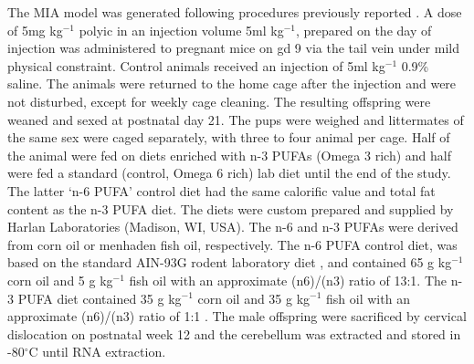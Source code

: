 The MIA model was generated following procedures previously reported \citep{Li2009c}. 
A dose of 5mg kg$^{-1}$ \gls{polyic} in an injection volume 5ml kg$^{-1}$, prepared on the day of injection was administered to pregnant mice on \gls{gd} 9 via the tail vein under mild physical constraint. 
Control animals received an injection of 5ml kg$^{-1}$ 0.9\% saline. 
The animals were returned to the home cage after the injection and were not disturbed, except for weekly cage cleaning.
The resulting offspring were weaned and sexed at postnatal day 21. 
The pups were weighed and littermates of the same sex were caged separately, with three to four animal per cage.
Half of the animal were fed on diets enriched with n-3 PUFAs (Omega 3 rich) and half were fed a standard (control, Omega 6 rich) lab diet until the end of the study.
The latter `n-6 PUFA' control diet had the same calorific value and total fat content as the n-3 PUFA diet. 
The diets were custom prepared and supplied by Harlan Laboratories (Madison, WI, USA). 
The n-6 and n-3 PUFAs were derived from corn oil or menhaden fish oil, respectively. 
The n-6 PUFA control diet, was based on the standard AIN-93G rodent laboratory diet \citep{Reeves1993}, and contained 65 g kg$^{-1}$ corn oil and 5 g kg$^{-1}$ fish oil with an approximate (n6)/(n3) ratio of 13:1. 
The n-3 PUFA diet contained 35 g kg$^{-1}$ corn oil and 35 g kg$^{-1}$ fish oil with an approximate (n6)/(n3) ratio of 1:1 \citep{Olivo2005}.
The male offspring were sacrificed by cervical dislocation on postnatal week 12 and the cerebellum was extracted and stored in -80$^{\circ}$C until RNA extraction.


